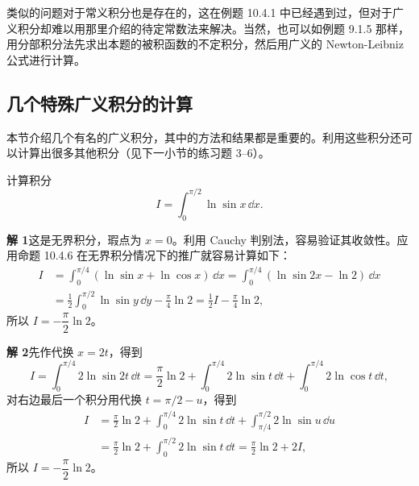 \begin{xremark}
类似的问题对于常义积分也是存在的，这在例题 10.4.1 中已经遇到过，但对于广义积分却难以用那里介绍的待定常数法来解决。当然，也可以如例题 9.1.5 那样，用分部积分法先求出本题的被积函数的不定积分，然后用广义的 Newton-Leibniz 公式进行计算。
\end{xremark}

\subsection{几个特殊广义积分的计算}

本节介绍几个有名的广义积分，其中的方法和结果都是重要的。利用这些积分还可以计算出很多其他积分（见下一小节的练习题 3--6）。

\begin{xexample}[12.3.4（Euler 积分）]
计算积分
\[
  I=\int_0^{\pi/2}\ln\sin x\,\dd x.
\]
\end{xexample}
\begin{xsolution}
\textbf{解 1}\quad 这是无界积分，瑕点为 $x=0$。利用 Cauchy 判别法，容易验证其收敛性。应用命题 10.4.6 在无界积分情况下的推广就容易计算如下：
\begin{align*}
  I
  &=\int_0^{\pi/4}(\ln\sin x+\ln\cos x)\,\dd x
   =\int_0^{\pi/4}(\ln\sin2x-\ln2)\,\dd x\\
  &=\frac12\int_0^{\pi/2}\ln\sin y\,\dd y-\frac\pi4\ln2
   =\frac12I-\frac\pi4\ln2,
\end{align*}
所以 $I=-\dfrac\pi2\ln2$。

\textbf{解 2}\quad 先作代换 $x=2t$，得到
\[
  I=\int_0^{\pi/4}2\ln\sin2t\,\dd t
   =\frac\pi2\ln2+\int_0^{\pi/4}2\ln\sin t\,\dd t
   +\int_0^{\pi/4}2\ln\cos t\,\dd t,
\]
对右边最后一个积分用代换 $t=\pi/2-u$，得到
\begin{align*}
  I
  &=\frac\pi2\ln2+\int_0^{\pi/4}2\ln\sin t\,\dd t
   +\int_{\pi/4}^{\pi/2}2\ln\sin u\,\dd u\\
  &=\frac\pi2\ln2+\int_0^{\pi/2}2\ln\sin t\,\dd t
   =\frac\pi2\ln2+2I,
\end{align*}
所以 $I=-\dfrac\pi2\ln2$。
\end{xsolution}

